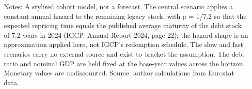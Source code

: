 \begin{table}[H]
\centering
\caption{Stylised refinancing scenario assumptions}
\label{tab:refinancing-assumptions}
\smallskip
\small Notes: A stylised cohort model, not a forecast. The central scenario applies a constant annual hazard to the remaining legacy stock, with p = 1/7.2 so that the expected repricing time equals the published average maturity of the debt stock of 7.2 years in 2024 (IGCP, Annual Report 2024, page 22); the hazard shape is an approximation applied here, not IGCP's redemption schedule. The slow and fast scenarios carry no external source and exist to bracket the assumption. The debt ratio and nominal GDP are held fixed at the base-year values across the horizon. Monetary values are undiscounted. Source: author calculations from Eurostat data.
\end{table}
